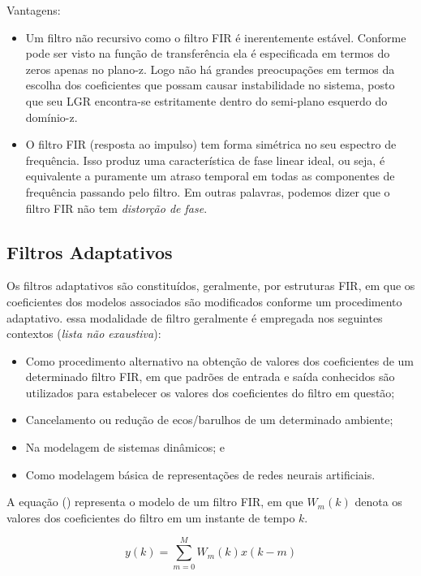 		Vantagens:
		\begin{itemize}
			\item Um filtro não recursivo como o filtro FIR é inerentemente estável. Conforme pode ser visto na função de transferência ela é especificada em termos do zeros apenas no plano-z. Logo não há grandes preocupações em termos da escolha dos coeficientes que possam causar instabilidade no sistema, posto que seu LGR encontra-se estritamente dentro do semi-plano esquerdo do domínio-z.
			\item O filtro FIR (resposta ao impulso) tem forma simétrica no seu espectro de frequência. Isso produz uma característica de fase linear ideal, ou seja, é equivalente a puramente um atraso temporal em todas as componentes de frequência passando pelo filtro. Em outras palavras, podemos dizer que o filtro FIR não tem \textit{distorção de fase}.
		\end{itemize}
	\cite{Lynn1998}
	
	\subsection{Filtros Adaptativos}
		Os filtros adaptativos são constituídos, geralmente, por estruturas FIR, em que os coeficientes dos modelos associados são modificados conforme um procedimento adaptativo. essa modalidade de filtro geralmente é empregada nos seguintes contextos (\textit{lista não exaustiva}):
		
		\begin{itemize}
			\item Como procedimento alternativo na obtenção de valores dos coeficientes de um determinado filtro FIR, em que padrões de entrada e saída conhecidos são utilizados para estabelecer os valores dos coeficientes do filtro em questão;
			\item Cancelamento ou redução de ecos/barulhos de um determinado ambiente;
			\item Na modelagem de sistemas dinâmicos; e
			\item Como modelagem básica de representações de redes neurais artificiais.
		\end{itemize}
	
		A equação () representa o modelo de um filtro FIR, em que $W_m(k)$ denota os valores dos coeficientes do filtro em um instante de tempo $k$. 
		
		\begin{equation}
			\label{eq1-filtroadap}
			y(k) = \sum_{m=0}^{M} W_m(k)x(k-m)
		\end{equation}
		
